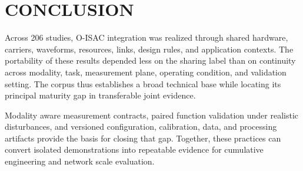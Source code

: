\section{CONCLUSION}
\label{sec:conclusion}
Across 206 studies, O-ISAC integration was realized through shared hardware,
carriers, waveforms, resources, links, design rules, and application contexts.
The portability of these results depended less on the sharing label than on
continuity across modality, task, measurement plane, operating condition, and
validation setting. The corpus thus establishes a broad technical base while
locating its principal maturity gap in transferable joint evidence.

Modality aware measurement contracts, paired function validation under
realistic disturbances, and versioned configuration, calibration, data, and
processing artifacts provide the basis for closing that gap. Together, these
practices can convert isolated demonstrations into repeatable evidence for
cumulative engineering and network scale evaluation.
